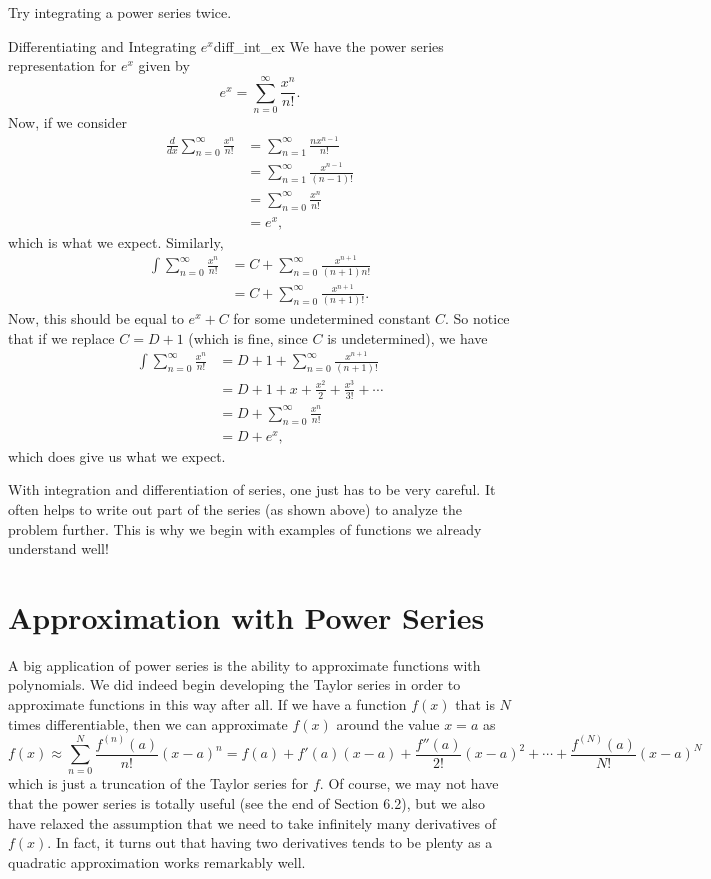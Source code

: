 \begin{exercise}
    Try integrating a power series twice.
\end{exercise}

\begin{ex}{Differentiating and Integrating $e^x$}{diff_int_ex}
We have the power series representation for $e^x$ given by
\[
e^x = \sum_{n=0}^\infty \frac{x^n}{n!}.
\]
Now, if we consider
\begin{align*}
    \frac{d}{dx} \sum_{n=0}^\infty \frac{x^n}{n!} &= \sum_{n=1}^\infty  \frac{nx^{n-1}}{n!}\\
    &=\sum_{n=1}^\infty \frac{x^{n-1}}{(n-1)!}\\
    &= \sum_{n=0}^\infty \frac{x^n}{n!}\\
    &=e^x,
\end{align*}
which is what we expect.  Similarly,
\begin{align*}
    \int \sum_{n=0}^\infty \frac{x^n}{n!} &= C+\sum_{n=0}^\infty \frac{x^{n+1}}{(n+1)n!}\\
    &= C+\sum_{n=0}^\infty \frac{x^{n+1}}{(n+1)!}.
\end{align*}
Now, this should be equal to $e^x+C$ for some undetermined constant $C$. So notice that if we replace $C=D+1$ (which is fine, since $C$ is undetermined), we have
\begin{align*}
    \int \sum_{n=0}^\infty \frac{x^n}{n!} &= D+1+\sum_{n=0}^\infty \frac{x^{n+1}}{(n+1)!}\\
    &= D + 1 + x+\frac{x^2}{2}+\frac{x^3}{3!}+\cdots\\
    &= D+ \sum_{n=0}^\infty \frac{x^n}{n!}\\
    &= D+e^x,
\end{align*}
which does give us what we expect.
\end{ex}

\begin{remark}
With integration and differentiation of series, one just has to be very careful. It often helps to write out part of the series (as shown above) to analyze the problem further.  This is why we begin with examples of functions we already understand well!
\end{remark}

\section{Approximation with Power Series}
A big application of power series is the ability to approximate functions with polynomials.  We did indeed begin developing the Taylor series in order to approximate functions in this way after all.  If we have a function $f(x)$ that is $N$ times differentiable, then we can approximate $f(x)$ around the value $x=a$ as
\[
f(x)\approx \sum_{n=0}^N \frac{f^{(n)}(a)}{n!}(x-a)^n = f(a)+f'(a)(x-a)+\frac{f''(a)}{2!}(x-a)^2+\cdots + \frac{f^{(N)}(a)}{N!}(x-a)^N
\]
which is just a truncation of the Taylor series for $f$. Of course, we may not have that the power series is totally useful (see the end of Section 6.2), but we also have relaxed the assumption that we need to take infinitely many derivatives of $f(x)$.  In fact, it turns out that having two derivatives tends to be plenty as a quadratic approximation works remarkably well.


